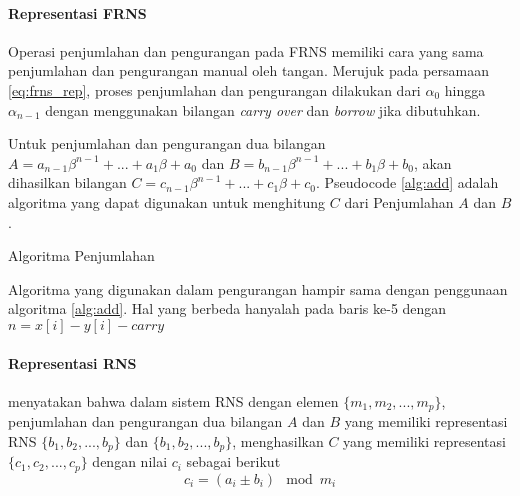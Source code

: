     \paragraph{Representasi FRNS}

    Operasi penjumlahan dan pengurangan pada FRNS memiliki cara yang sama penjumlahan dan pengurangan manual oleh tangan. Merujuk pada persamaan \ref{eq:frns_rep}, proses penjumlahan dan pengurangan dilakukan dari $\alpha_0$ hingga $\alpha_{n-1}$ dengan menggunakan bilangan \textit{carry over} dan \textit{borrow} jika dibutuhkan.

    Untuk penjumlahan dan pengurangan dua bilangan $A = a_{n-1}\beta^{n-1}+...+a_{1}\beta+a_{0}$ dan $B = b_{n-1}\beta^{n-1}+...+b_{1}\beta+b_{0}$, akan dihasilkan bilangan $C = c_{n-1}\beta^{n-1}+...+c_{1}\beta+c_{0}$. Pseudocode \ref{alg:add} adalah algoritma yang dapat digunakan untuk menghitung $C$ dari Penjumlahan $A$ dan $B$.

    \begin{algorithm}
      \caption{Algoritma Penjumlahan}
        \label{alg:add}
      \begin{algorithmic}[1]
        \Statex
          \EndFor
          \State {}
        \EndFunction
      \end{algorithmic}
    \end{algorithm}

    Algoritma yang digunakan dalam pengurangan hampir sama dengan penggunaan algoritma \ref{alg:add}. Hal yang berbeda hanyalah pada baris ke-5 dengan $n = x[i] - y[i] - carry $

    \paragraph{Representasi RNS}

    \citet{rns_sharoun} menyatakan bahwa dalam sistem RNS dengan elemen $\{m_1,m_2,...,m_p\}$, penjumlahan dan pengurangan dua bilangan $A$ dan $B$ yang memiliki representasi RNS $\{b_1,b_2,...,b_p\}$ dan $\{b_1,b_2,...,b_p\}$,  menghasilkan $C$ yang memiliki representasi $\{c_1,c_2,...,c_p\}$ dengan nilai $c_i$ sebagai berikut
    \begin{equation}
        c_i = (a_i \pm b_i) \mod m_i
    \end{equation}



